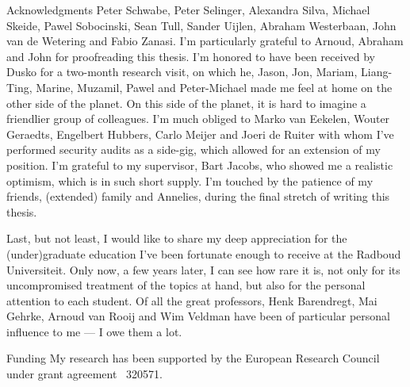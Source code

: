 \documentclass[b]{subfiles}
\begin{document}
\begin{parsec}
\begin{point}{Acknowledgments}
    Peter Schwabe,
    Peter Selinger,
    Alexandra Silva,
    Michael Skeide,
    Pawel Sobocinski,
    Sean Tull,
    Sander Uijlen,
    Abraham Westerbaan,
    John van de Wetering and
    Fabio Zanasi.
I'm particularly grateful to Arnoud, Abraham and John
    for proofreading this thesis.
I'm honored to have been received by Dusko
    for a two-month research visit,
    on which he, Jason, Jon, Mariam, Liang-Ting, Marine, Muzamil, Pawel
    and Peter-Michael made me feel at home on the other side of the planet.
On this side of the planet,
    it is hard to imagine a friendlier group of colleagues.
I'm much obliged to Marko van Eekelen,
    Wouter Geraedts,
    Engelbert Hubbers,
    Carlo Meijer and
    Joeri de Ruiter
    with whom I've performed security audits as a side-gig,
    which allowed for an extension of my position.
I'm grateful to my supervisor, Bart Jacobs,
    who showed me a realistic optimism,
    which is in such short supply.
I'm touched by the patience of my friends, (extended) family and Annelies,
    during the final stretch of writing this thesis.

Last, but not least, I would like to share my deep appreciation
    for the (under)graduate education
    I've been fortunate enough to receive at the Radboud Universiteit.
Only now, a few years later,
    I can see how rare it is,
    not only for its uncompromised treatment of the topics at hand,
    but also for the personal attention to each student.
Of all the great professors,
Henk Barendregt,
    Mai Gehrke, Arnoud van Rooij and Wim Veldman
    have been of particular personal influence to me --- I owe them a lot.
\begin{point}{Funding}
My research has been supported by the
European Research Council under grant agreement \textnumero~320571.
\end{point}
\end{point}
\end{parsec}
\end{document}
